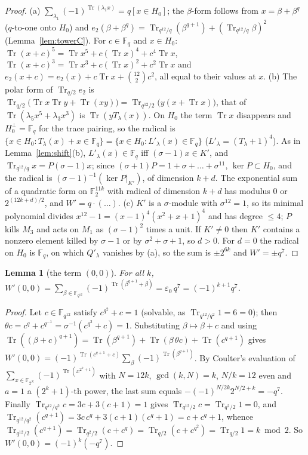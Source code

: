 \documentclass[11pt,a4paper]{amsart}
\newtheorem{lemma}[theorem]{Lemma}
\theoremstyle{definition}
\newcommand{\F}{\mathbb{F}}
\newcommand{\Tr}{\operatorname{Tr}}
\newcommand{\sgn}{\varepsilon_0}
\begin{document}
\begin{proof}
(a) $\sum_{\lambda_1}(-1)^{\Tr(\lambda_1x)}=q[x\in H_0]$; the $\beta$-form follows from $x=\beta+\beta^q$ ($q$-to-one onto $H_0$) and $e_2(\beta+\beta^q)=\Tr_{q^{12}/q}(\beta^{q+1})+(\Tr_{q^{12}/q}\beta)^2$ (Lemma~\ref{lem:towerC}). For $c\in\F_q$ and $x\in H_0$: $\Tr(x+c)^5=\Tr x^5+c(\Tr x)^4+c^4\Tr x$, $\Tr(x+c)^3=\Tr x^3+c(\Tr x)^2+c^2\Tr x$ and $e_2(x+c)=e_2(x)+c\Tr x+\binom{12}2c^2$, all equal to their values at $x$. (b) The polar form of $\Tr_{q/2}e_2$ is $\Tr_{q/2}\bigl(\Tr x\Tr y+\Tr(xy)\bigr)=\Tr_{q^{12}/2}\bigl(y(x+\Tr x)\bigr)$, that of $\Tr(\lambda_5x^5+\lambda_3x^3)$ is $\Tr(yT_\lambda(x))$. On $H_0$ the term $\Tr x$ disappears and $H_0^\perp=\F_q$ for the trace pairing, so the radical is $\{x\in H_0:T_\lambda(x)+x\in\F_q\}=\{x\in H_0:L'_\lambda(x)\in\F_q\}$ ($L'_\lambda=(T_\lambda+1)^4$). As in Lemma~\ref{lem:shift}(b), $L'_\lambda(x)\in\F_q$ iff $(\sigma-1)x\in K'$, and $\Tr_{q^{12}/q}x=P(\sigma-1)x$; since $(\sigma+1)P=1+\sigma+\dots+\sigma^{11}$, $\ker P\subset H_0$, and the radical is $(\sigma-1)^{-1}(\ker P|_{K'})$, of dimension $k+d$. The exponential sum of a quadratic form on $\F_2^{11k}$ with radical of dimension $k+d$ has modulus $0$ or $2^{(12k+d)/2}$, and $W'=q\cdot(\ldots)$. (c) $K'$ is a $\sigma$-module with $\sigma^{12}=1$, so its minimal polynomial divides $x^{12}-1=(x-1)^4(x^2+x+1)^4$ and has degree $\le4$; $P$ kills $M_3$ and acts on $M_1$ as $(\sigma-1)^2$ times a unit. If $K'\ne0$ then $K'$ contains a nonzero element killed by $\sigma-1$ or by $\sigma^2+\sigma+1$, so $d>0$. For $d=0$ the radical on $H_0$ is $\F_q$, on which $Q'_\lambda$ vanishes by (a), so the sum is $\pm2^{6k}$ and $W'=\pm q^7$.
\end{proof}

\begin{lemma}[the term $(0,0)$]\label{lem:Wp00}
For all $k$, $W'(0,0)=\sum_{\beta\in\F_{q^{12}}}(-1)^{\Tr(\beta^{q+1}+\beta)}=\sgn\,q^7=(-1)^{k+1}q^7$.
\end{lemma}
\begin{proof}
Let $c\in\F_{q^{12}}$ satisfy $c^{q^2}+c=1$ (solvable, as $\Tr_{q^{12}/q^2}1=6=0$); then $\theta c=c^q+c^{q^{-1}}=\sigma^{-1}(c^{q^2}+c)=1$. Substituting $\beta\mapsto\beta+c$ and using $\Tr((\beta+c)^{q+1})=\Tr(\beta^{q+1})+\Tr(\beta\,\theta c)+\Tr(c^{q+1})$ gives $W'(0,0)=(-1)^{\Tr(c^{q+1}+c)}\sum_\beta(-1)^{\Tr(\beta^{q+1})}$. By Coulter's evaluation \cite[Thm.~4.2]{Coulter} of $\sum_{x\in\F_{2^N}}(-1)^{\Tr(x^{2^k+1})}$ with $N=12k$, $\gcd(k,N)=k$, $N/k=12$ even and $a=1$ a $(2^k+1)$-th power, the last sum equals $-(-1)^{N/2k}2^{N/2+k}=-q^7$. Finally $\Tr_{q^{12}/q^2}c=3c+3(c+1)=1$ gives $\Tr_{q^{12}/2}c=\Tr_{q^2/2}1=0$, and $\Tr_{q^{12}/q^2}(c^{q+1})=3c\,c^q+3(c+1)(c^q+1)=c+c^q+1$, whence $\Tr_{q^{12}/2}(c^{q+1})=\Tr_{q^2/2}(c+c^q)=\Tr_{q/2}(c+c^{q^2})=\Tr_{q/2}1=k\bmod2$. So $W'(0,0)=(-1)^k(-q^7)$.
\end{proof}
\end{document}
